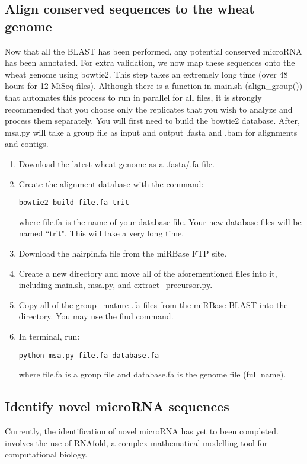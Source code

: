 \documentclass[12pt,titlepage]{article}
\begin{document}
\subsection{Align conserved sequences to the wheat genome}
Now that all the BLAST has been performed, any potential conserved microRNA has been annotated. For extra validation, we now map these sequences onto the wheat genome using bowtie2. This step takes an extremely long time (over 48 hours for 12 MiSeq files). Although there is a function in main.sh (align\_group()) that automates this process to run in parallel for all files, it is strongly recommended that you choose only the replicates that you wish to analyze and process them separately. You will first need to build the bowtie2 database. After, msa.py will take a group file as input and output .fasta and .bam for alignments and contigs.
\begin{enumerate}
\item Download the latest wheat genome as a .fasta/.fa file.
\item Create the alignment database with the command:
\begin{tcolorbox}
\begin{lstlisting}
bowtie2-build file.fa trit 
\end{lstlisting}
\end{tcolorbox}where file.fa is the name of your database file. Your new database files will be named ``trit". This will take a very long time.
\item Download the hairpin.fa file from the miRBase FTP site.
\item Create a new directory and move all of the aforementioned files into it, including main.sh, msa.py, and extract\_precursor.py.
\item Copy all of the group\_mature .fa files from the miRBase BLAST into the directory. You may use the find command.
\item In terminal, run:
\begin{tcolorbox}
\begin{lstlisting}
python msa.py file.fa database.fa
\end{lstlisting}
\end{tcolorbox}where file.fa is a group file and database.fa is the genome file (full name).
\end{enumerate}

\subsection{Identify novel microRNA sequences}
Currently, the identification of novel microRNA has yet to been completed. involves the use of RNAfold, a complex mathematical modelling tool for computational biology.\\ 
\end{document}
